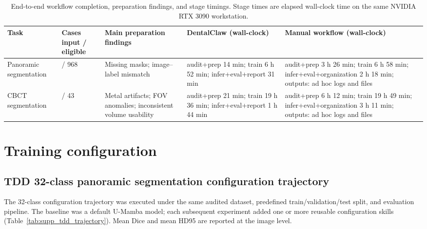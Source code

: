 \documentclass[final,5p,times,twocolumn]{elsarticle}
\begin{document}
\begin{table}[!ht]
\centering
\small
\setlength{\tabcolsep}{4pt}
\caption{End-to-end workflow completion, preparation findings, and stage timings. Stage times are elapsed wall-clock time on the same NVIDIA RTX 3090 workstation.}
\label{tab:supp_workflow}
\begin{tabularx}{\textwidth}{>{\raggedright\arraybackslash}p{3.0cm} >{\centering\arraybackslash}p{1.5cm} >{\raggedright\arraybackslash}p{2.6cm} >{\raggedright\arraybackslash}X >{\raggedright\arraybackslash}X}
\toprule
Task & Cases input / eligible & Main preparation findings & DentalClaw (wall-clock) & Manual workflow (wall-clock) \\
\midrule
Panoramic segmentation & 1051 / 968 & Missing masks; image--label mismatch & audit+prep 14 min; train 6 h 52 min; infer+eval+report 31 min & audit+prep 3 h 26 min; train 6 h 58 min; infer+eval+organization 2 h 18 min; outputs: ad hoc logs and files \\
\addlinespace
CBCT segmentation & 63 / 43 & Metal artifacts; FOV anomalies; inconsistent volume usability & audit+prep 21 min; train 19 h 36 min; infer+eval+report 1 h 44 min & audit+prep 6 h 12 min; train 19 h 49 min; infer+eval+organization 3 h 11 min; outputs: ad hoc logs and files \\
\bottomrule
\end{tabularx}
\end{table}

\section{Training configuration}

\subsection{TDD 32-class panoramic segmentation configuration trajectory}

The 32-class configuration trajectory was executed under the same audited dataset, predefined train/validation/test split, and evaluation pipeline. The baseline was a default U-Mamba model; each subsequent experiment added one or more reusable configuration skills (Table~\ref{tab:supp_tdd_trajectory}). Mean Dice and mean HD95 are reported at the image level.
\end{document}
